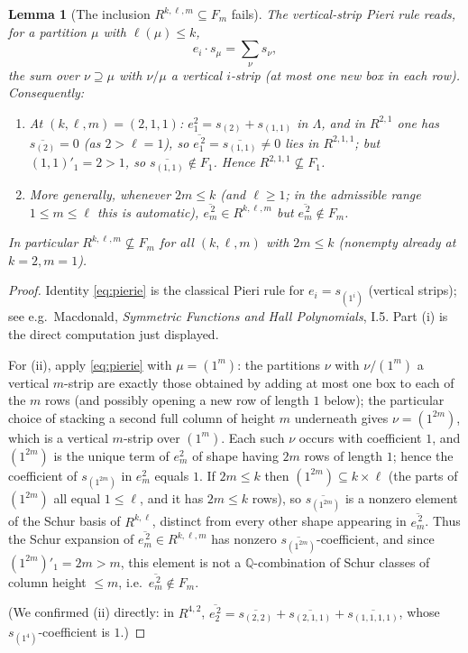 \documentclass{amsart}
\newtheorem{lemma}{Lemma}
\theoremstyle{definition}
\newcommand{\Q}{\mathbb{Q}}
\newcommand{\rkl}{R^{k,\ell}}
\newcommand{\Rklm}{R^{k,\ell,m}}
\begin{document}
\begin{lemma}[The inclusion $\Rklm\subseteq F_m$ fails]\label{lem:RnotinF}
The vertical-strip Pieri rule reads, for a partition $\mu$ with $\ell(\mu)\le k$,
\begin{equation}\label{eq:pierie}
e_i\cdot s_\mu=\sum_{\nu}s_\nu ,
\end{equation}
the sum over $\nu\supseteq\mu$ with $\nu/\mu$ a vertical $i$-strip (at most one new
box in each row). Consequently:
\begin{enumerate}
\item[\textup{(i)}] At $(k,\ell,m)=(2,1,1)$: $e_1^2=s_{(2)}+s_{(1,1)}$ in $\Lambda$,
and in $R^{2,1}$ one has $\overline{s_{(2)}}=0$ (as $2>\ell=1$), so
$\overline{e_1^{\,2}}=\overline{s_{(1,1)}}\neq0$ lies in $R^{2,1,1}$; but
$(1,1)'_1=2>1$, so $\overline{s_{(1,1)}}\notin F_1$. Hence $R^{2,1,1}\not\subseteq F_1$.
\item[\textup{(ii)}] More generally, whenever $2m\le k$ \textup{(}and $\ell\ge1$;
in the admissible range $1\le m\le\ell$ this is automatic\textup{)},
$\overline{e_m^{\,2}}\in\Rklm$ but $\overline{e_m^{\,2}}\notin F_m$.
\end{enumerate}
In particular $\Rklm\not\subseteq F_m$ for all $(k,\ell,m)$ with $2m\le k$ (nonempty
already at $k=2,m=1$).
\end{lemma}

\begin{proof}
Identity \eqref{eq:pierie} is the classical Pieri rule for $e_i=s_{(1^i)}$
(vertical strips); see e.g.\ Macdonald, \emph{Symmetric Functions and Hall
Polynomials}, I.5. Part (i) is the direct computation just displayed.

For (ii), apply \eqref{eq:pierie} with $\mu=(1^m)$: the partitions $\nu$ with
$\nu/(1^m)$ a vertical $m$-strip are exactly those obtained by adding at most one box
to each of the $m$ rows (and possibly opening a new row of length $1$ below); the
particular choice of stacking a second full column of height $m$ underneath gives
$\nu=(1^{2m})$, which is a vertical $m$-strip over $(1^m)$. Each such $\nu$ occurs
with coefficient $1$, and $(1^{2m})$ is the unique term of $e_m^2$ of shape having
$2m$ rows of length $1$; hence the coefficient of $s_{(1^{2m})}$ in $e_m^2$ equals
$1$. If $2m\le k$ then $(1^{2m})\subseteq k\times\ell$ (the parts of $(1^{2m})$ all
equal $1\le\ell$, and it has $2m\le k$ rows), so $\overline{s_{(1^{2m})}}$ is a nonzero element of the Schur basis
of $\rkl$, distinct from every other shape appearing in $\overline{e_m^{\,2}}$. Thus
the Schur expansion of $\overline{e_m^{\,2}}\in\Rklm$ has nonzero
$\overline{s_{(1^{2m})}}$-coefficient, and since $(1^{2m})'_1=2m>m$, this element is
not a $\Q$-combination of Schur classes of column height $\le m$, i.e.\
$\overline{e_m^{\,2}}\notin F_m$.

(We confirmed (ii) directly: in $R^{4,2}$, $\overline{e_2^{\,2}}=
\overline{s_{(2,2)}}+\overline{s_{(2,1,1)}}+\overline{s_{(1,1,1,1)}}$, whose
$s_{(1^4)}$-coefficient is $1$.)
\end{proof}
\end{document}
